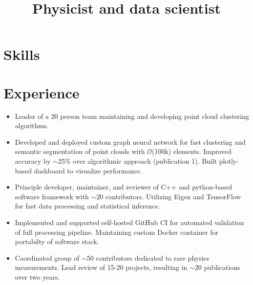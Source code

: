 \documentclass[9pt,a4paper]{moderncv}
\title{Physicist and data scientist}               %
\begin{document}
\maketitle


\vspace{-1cm}
\section{Skills}


\section{Experience}
{
\begin{itemize}
    \item Leader of a 20 person team maintaining and developing point cloud clustering algorithms.
    \item Developed and deployed custom graph neural network for fast clustering and semantic segmentation of point clouds with $\mathcal{O}$(100k) elements.
        Improved accuracy by $\sim$25\% over algorithmic approach (publication 1). Built plotly-based dashboard to visualize performance.
    \item Principle developer, maintainer, and reviewer of C++ and python-based software framework with $\sim$20 contributors. Utilizing Eigen and TensorFlow for fast data processing and statistical inference.
    \item Implemented and supported self-hosted GitHub CI for automated validation of full processing pipeline. Maintaining custom Docker container for portabilty of software stack.
    \item Coordinated group of $\sim$50 contributors dedicated to rare physics measurements. Lead review of 15-20 projects, resulting in $\sim$20 publications over two years.
\end{itemize}
}
\end{document}
